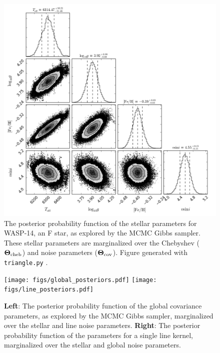 \documentclass[iop,floatfix]{emulateapj}
\newcommand{\vT}{ {\bm \Theta}}
\begin{document}
\begin{figure}[!htb]
\begin{center}
  \includegraphics[width=5in]{figs/stellar_triangle_Kurucz.png}
  \caption{The posterior probability function of the stellar parameters for WASP-14, an F star, as explored by the MCMC Gibbs sampler. These stellar parameters are marginalized over the Chebyshev ($\vT_{\rm cheb}$) and noise parameters ($\vT_{\rm cov}$). Figure generated with \texttt{triangle.py} \citep{foreman-mackey14}.
}
\label{fig:stellar_posterior}
\end{center}
\end{figure}

\begin{figure}[!htb]
\begin{center}
  \texttt{[image: figs/global\_posteriors.pdf]}
  \texttt{[image: figs/line\_posteriors.pdf]}
  \caption{\textbf{Left}: The posterior probability function of the global covariance parameters, as explored by the MCMC Gibbs sampler, marginalized over the stellar and line noise parameters. \textbf{Right}: The posterior probability function of the parameters for a single line kernel, marginalized over the stellar and global noise parameters.}
\label{fig:noise_posterior}
\end{center}
\end{figure}
\end{document}
